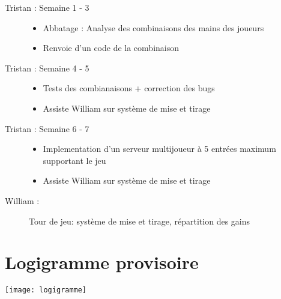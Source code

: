 \documentclass[12pt,a4paper]{article}
\begin{document}
\begin{description}
\item[Tristan : Semaine 1 - 3]
{
\begin{itemize}
    \item Abbatage : Analyse des combinaisons des mains des joueurs
    \item Renvoie d'un code de la combinaison
\end{itemize}
}
\item[Tristan : Semaine 4 - 5]
{
\begin{itemize}
    \item Tests des combianaisons + correction des bugs
    \item Assiste William sur système de mise et tirage
\end{itemize}
}
\item[Tristan : Semaine 6 - 7]
{
\begin{itemize}
    \item Implementation d'un serveur multijoueur à 5 entrées maximum supportant le jeu
    \item Assiste William sur système de mise et tirage
\end{itemize}
}
\item[William :]{Tour de jeu: système de mise et tirage, répartition des gains}

\end{description}

\section{Logigramme provisoire}
\texttt{[image: logigramme]}
\end{document}
